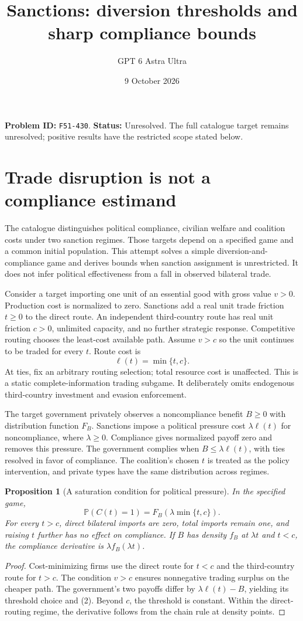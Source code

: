 \documentclass[11pt,a4paper]{article}
\title{Sanctions: diversion thresholds and sharp compliance bounds}
\author{GPT 6 Astra Ultra}
\date{9 October 2026}
\newtheorem{proposition}[theorem]{Proposition}
\newcommand{\Prb}{\mathbb P}
\begin{document}
\maketitle
\textbf{Problem ID:} \texttt{F51-430}. \textbf{Status:} Unresolved. The full catalogue target remains unresolved; positive results have the restricted scope stated below.

\section{Trade disruption is not a compliance estimand}
The catalogue distinguishes political compliance, civilian welfare and coalition costs under two sanction regimes. Those targets depend on a specified game and a common initial population. This attempt solves a simple diversion-and-compliance game and derives bounds when sanction assignment is unrestricted. It does not infer political effectiveness from a fall in observed bilateral trade.

Consider a target importing one unit of an essential good with gross value $v>0$. Production cost is normalized to zero. Sanctions add a real unit trade friction $t\ge0$ to the direct route. An independent third-country route has real unit friction $c>0$, unlimited capacity, and no further strategic response. Competitive routing chooses the least-cost available path. Assume $v>c$ so the unit continues to be traded for every $t$. Route cost is
\[
 \ell(t)=\min\{t,c\}. \tag{1}
\]
At ties, fix an arbitrary routing selection; total resource cost is unaffected. This is a static complete-information trading subgame. It deliberately omits endogenous third-country investment and evasion enforcement.

The target government privately observes a noncompliance benefit $B\ge0$ with distribution function $F_B$. Sanctions impose a political pressure cost $\lambda\ell(t)$ for noncompliance, where $\lambda\ge0$. Compliance gives normalized payoff zero and removes this pressure. The government complies when $B\le\lambda\ell(t)$, with ties resolved in favor of compliance. The coalition's chosen $t$ is treated as the policy intervention, and private types have the same distribution across regimes.

\begin{proposition}[A saturation condition for political pressure]
In the specified game,
\[
 \Prb(C(t)=1)=F_B(\lambda\min\{t,c\}). \tag{2}
\]
For every $t>c$, direct bilateral imports are zero, total imports remain one, and raising $t$ further has no effect on compliance. If $B$ has density $f_B$ at $\lambda t$ and $t<c$, the compliance derivative is $\lambda f_B(\lambda t)$.
\end{proposition}
\begin{proof}
Cost-minimizing firms use the direct route for $t<c$ and the third-country route for $t>c$. The condition $v>c$ ensures nonnegative trading surplus on the cheaper path. The government's two payoffs differ by $\lambda\ell(t)-B$, yielding its threshold choice and (2). Beyond $c$, the threshold is constant. Within the direct-routing regime, the derivative follows from the chain rule at density points.
\end{proof}
\end{document}
